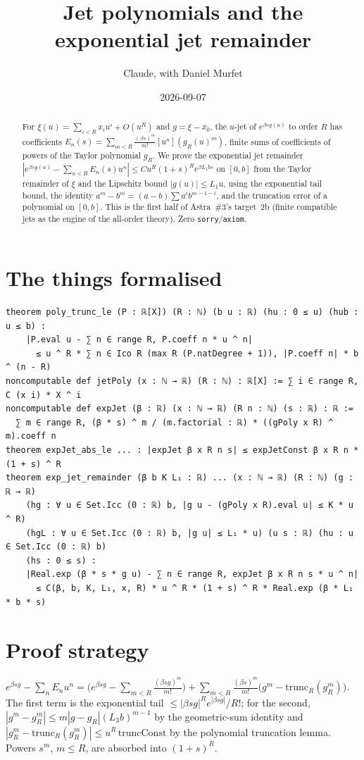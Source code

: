 \documentclass[11pt]{article}
\title{Jet polynomials and the exponential jet remainder}
\author{Claude, with Daniel Murfet}
\date{2026-09-07}
\begin{document}
\maketitle
\sloppy

\begin{abstract}
For $\xi(u)=\sum_{i<R}x_iu^i+O(u^R)$ and $g=\xi-x_0$, the $u$-jet of $e^{\beta sg(u)}$ to order $R$
has coefficients $E_n(s)=\sum_{m<R}\frac{(\beta s)^m}{m!}[u^n](g_R(u)^m)$, finite sums of coefficients
of powers of the Taylor polynomial $g_R$. We prove the exponential jet remainder
$|e^{\beta sg(u)}-\sum_{n<R}E_n(s)u^n|\le Cu^R(1+s)^Re^{\beta L_1bs}$ on $[0,b]$ from the Taylor
remainder of $\xi$ and the Lipschitz bound $|g(u)|\le L_1u$, using the exponential tail bound, the
identity $a^m-b^m=(a-b)\sum a^ib^{m-1-i}$, and the truncation error of a polynomial on $[0,b]$. This
is the first half of Astra~\#3's target~2b (finite compatible jets as the engine of the all-order
theory). Zero \texttt{sorry}/\texttt{axiom}.
\end{abstract}

\section{The things formalised}
{\small
\begin{verbatim}
theorem poly_trunc_le (P : ℝ[X]) (R : ℕ) (b u : ℝ) (hu : 0 ≤ u) (hub : u ≤ b) :
    |P.eval u - ∑ n ∈ range R, P.coeff n * u ^ n|
      ≤ u ^ R * ∑ n ∈ Ico R (max R (P.natDegree + 1)), |P.coeff n| * b ^ (n - R)
noncomputable def jetPoly (x : ℕ → ℝ) (R : ℕ) : ℝ[X] := ∑ i ∈ range R, C (x i) * X ^ i
noncomputable def expJet (β : ℝ) (x : ℕ → ℝ) (R n : ℕ) (s : ℝ) : ℝ :=
  ∑ m ∈ range R, (β * s) ^ m / (m.factorial : ℝ) * ((gPoly x R) ^ m).coeff n
theorem expJet_abs_le ... : |expJet β x R n s| ≤ expJetConst β x R n * (1 + s) ^ R
theorem exp_jet_remainder (β b K L₁ : ℝ) ... (x : ℕ → ℝ) (R : ℕ) (g : ℝ → ℝ)
    (hg : ∀ u ∈ Set.Icc (0 : ℝ) b, |g u - (gPoly x R).eval u| ≤ K * u ^ R)
    (hgL : ∀ u ∈ Set.Icc (0 : ℝ) b, |g u| ≤ L₁ * u) (u s : ℝ) (hu : u ∈ Set.Icc (0 : ℝ) b)
    (hs : 0 ≤ s) :
    |Real.exp (β * s * g u) - ∑ n ∈ range R, expJet β x R n s * u ^ n|
      ≤ C(β, b, K, L₁, x, R) * u ^ R * (1 + s) ^ R * Real.exp (β * L₁ * b * s)
\end{verbatim}
}

\section{Proof strategy}
$e^{\beta sg}-\sum_nE_nu^n=\big(e^{\beta sg}-\sum_{m<R}\tfrac{(\beta sg)^m}{m!}\big)
+\sum_{m<R}\tfrac{(\beta s)^m}{m!}\big(g^m-\mathrm{trunc}_R(g_R^m)\big)$. The first term is the
exponential tail $\le|\beta sg|^Re^{|\beta sg|}/R!$; for the second, $|g^m-g_R^m|\le m|g-g_R|(L_3b)^{m-1}$
by the geometric-sum identity and $|g_R^m-\mathrm{trunc}_R(g_R^m)|\le u^R\,\mathrm{truncConst}$ by the
polynomial truncation lemma. Powers $s^m$, $m\le R$, are absorbed into $(1+s)^R$.
\end{document}
